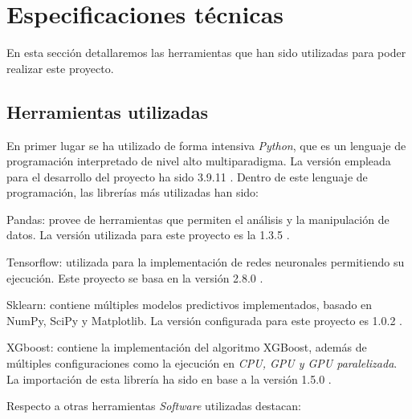             

    \section{Especificaciones técnicas}

        En esta sección detallaremos las herramientas que han sido utilizadas para poder realizar este proyecto.


        \subsection{Herramientas utilizadas}
            En primer lugar se ha utilizado de forma intensiva \textit{Python}, que es un lenguaje de programación interpretado de nivel alto multiparadigma. La versión empleada para el desarrollo del proyecto ha sido 3.9.11 \cite{Python}. Dentro de este lenguaje de programación, las librerías más utilizadas han sido:

            \begin{description}

                \item Pandas: provee de herramientas que permiten el análisis y la manipulación de datos. La versión utilizada para este proyecto es la 1.3.5 \cite{Pandas}.

                \item Tensorflow: utilizada para la implementación de redes neuronales permitiendo su ejecución. Este proyecto se basa en la versión 2.8.0 \cite{Tensorflow}.

                \item Sklearn: contiene múltiples modelos predictivos implementados, basado en NumPy, SciPy y Matplotlib. La versión configurada para este proyecto es 1.0.2 \cite{Scikit-Learn}.

                \item XGboost: contiene la implementación del algoritmo XGBoost, además de múltiples configuraciones como la ejecución en \textit{CPU, GPU y GPU paralelizada}. La importación de esta librería ha sido en base a la versión 1.5.0 \cite{XGBoostLibrary}.

            \end{description}

            Respecto a otras herramientas \textit{Software} utilizadas destacan:

